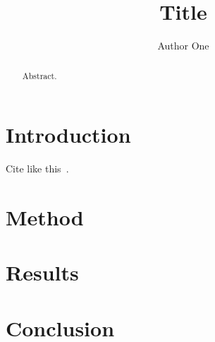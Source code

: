 \documentclass[acmtog]{acmart}
\title{Title}
\author{Author One}
\affiliation{\institution{Institution}\country{Country}}
\begin{document}
\begin{abstract}
Abstract.
\end{abstract}
\maketitle
\section{Introduction}
Cite like this~\cite{example2026}.
\section{Method}
\section{Results}
\section{Conclusion}


\end{document}
